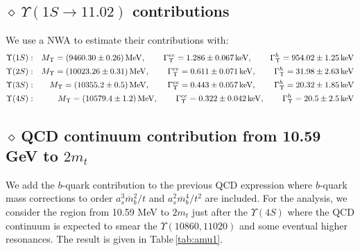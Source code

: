 \documentclass[review]{elsarticle}
\def\bea{\begin{eqnarray}}
\def\eea{\end{eqnarray}}
\def\nnb{\nonumber}
\def\nnb{\nonumber}
\def\d{$\diamond~$}
\begin{document}
\subsection*{ \vspace*{0.5cm} \d $\Upsilon(1S\to 11.02)$ contributions}
We use a NWA to estimate their contributions with:
\bea
\Upsilon(1S)&:&  M_\Upsilon=(9460.30\pm 0.26)\,{\rm MeV},\,\,\,\,\,\,        \,\,\,\,  \,\,\,\Gamma^{ee}_\Upsilon=1.286\pm 0.067\,{\rm keV},\,\,\,\,\,\,  \,\,\,\,\,  \,\,\Gamma^{h}_\Upsilon=954.02\pm 1.25\,{\rm keV} \nnb\\
\Upsilon(2S)&:&  M_\Upsilon=(10023.26\pm 0.31)\,{\rm MeV},\,\,\,\,\,\,        \,\,\,\,  \,\,\,\Gamma^{ee}_\Upsilon=0.611\pm 0.071\,{\rm keV},\,\,\,\,\,\,  \,\,\,\,\,  \,\,\Gamma^{h}_\Upsilon=31.98\pm 2.63\,{\rm keV} \nnb\\
\Upsilon(3S)&:&  M_\Upsilon=(10355.2\pm 0.5)\,{\rm MeV},\,\,\,\,\,\,        \,\,\,\,  \,\,\,\Gamma^{ee}_\Upsilon=0.443\pm 0.057\,{\rm keV},\,\,\,\,\,\,  \,\,\,\,\,  \,\,\Gamma^{h}_\Upsilon=20.32\pm 1.85\,{\rm keV} \nnb\\
\Upsilon(4S)&:&  M_\Upsilon=(10579.4\pm 1.2)\,{\rm MeV},\,\,\,\,\,\,        \,\,\,\,  \,\,\,\Gamma^{ee}_\Upsilon=0.322\pm 0.042\,{\rm keV},\,\,\,\,\,\,  \,\,\,\,\,  \,\,\Gamma^{h}_\Upsilon=20.5\pm 2.5\,{\rm keV} 
\eea
\subsection*{ \vspace*{0.5cm} \d QCD continuum contribution from  10.59 GeV to $2m_t$}
We add the $b$-quark contribution to the previous QCD expression where $b$-quark mass corrections to order $a_s^3\overline{m}_b^2/t$ and $a_s^2\overline{m}_b^4/t^2$ are included. 
For the analysis, we consider the region from 10.59 MeV to $2m_t$ just after the $\Upsilon(4S)$ where the QCD continuum is expected to smear the  $\Upsilon(10860, 11020)$  and some eventual  higher resonances. The result is given in Table\,\ref{tab:amu1}. 
\end{document}
